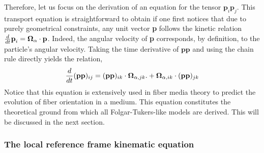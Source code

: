 Therefore, let us focus on the derivation of an equation for the tensor  $\textbf{p}_i \textbf{p}_j$. 
This transport equation is straightforward to obtain if one first notices that due to purely geometrical constraints, any unit vector \textbf{p} follows the kinetic relation $\frac{d}{dt} \textbf{p}_i = \bm\Omega_\alpha \cdot \textbf{p}$.
Indeed, the angular velocity of \textbf{p} corresponds, by definition, to the particle's angular velocity. 
Taking the time derivative of $\textbf{pp}$ and using the chain rule directly yields the relation, 
\begin{equation}
    \ddt (\textbf{pp})_{ij}
    = 
    (\textbf{pp})_{ik}\cdot\bm\Omega_{\alpha,jk}. 
    +\bm\Omega_{\alpha,ik}\cdot (\textbf{pp})_{jk}
    \label{eq:dt_pp}
\end{equation}
Notice that this equation is extensively used in fiber media theory to predict the evolution of fiber orientation in a medium. 
This equation constitutes the theoretical ground from which all Folgar-Tukers-like models are derived. 
This will be discussed in the next section.

\subsubsection{The local reference frame kinematic equation}

